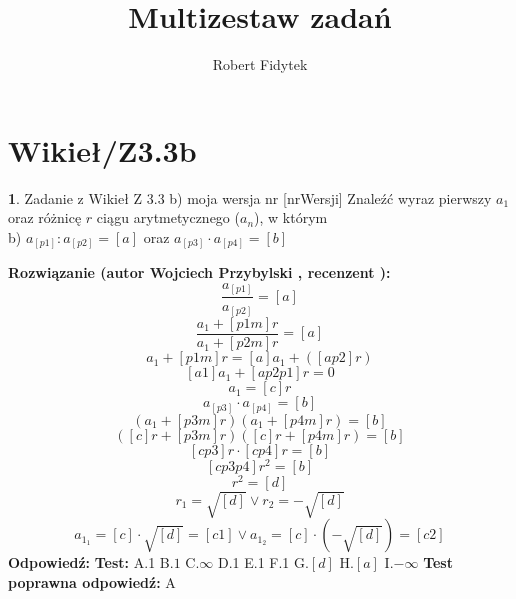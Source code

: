 \documentclass[12pt, a4paper]{article}
\title{Multizestaw zadań}
\author{Robert Fidytek}
\date{}
\theoremstyle{definition} %
\newtheorem{zad}{}
\newcommand{\kategoria}[1]{\section{#1}} %
\newcommand{\zadStart}[1]{\begin{zad}#1\newline} %
\newcommand{\zadStop}{\end{zad}}   %
\newcommand{\rozwStart}[2]{\noindent \textbf{Rozwiązanie (autor #1 , recenzent #2): }\newline} %
\newcommand{\rozwStop}{\newline}                                            %
\newcommand{\odpStart}{\noindent \textbf{Odpowiedź:}\newline}    %
\newcommand{\odpStop}{\newline}                                             %
\newcommand{\testStart}{\noindent \textbf{Test:}\newline} %
\newcommand{\testStop}{\newline} %
\newcommand{\kluczStart}{\noindent \textbf{Test poprawna odpowiedź:}\newline} %
\newcommand{\kluczStop}{\newline} %
\begin{document}
\maketitle


\kategoria{Wikieł/Z3.3b}
\zadStart{Zadanie z Wikieł Z 3.3 b) moja wersja nr [nrWersji]}
Znaleźć wyraz pierwszy $a_{1}$ oraz różnicę $r$ ciągu arytmetycznego ($a_{n}$), w którym \\
b) $a_{[p1]} : a_{[p2]}=[a]$ oraz $a_{[p3]}\cdot a_{[p4]}=[b]$
\zadStop
\rozwStart{Wojciech Przybylski}{}
$$\frac{a_{[p1]}}{a_{[p2]}}=[a]$$
$$\frac{a_{1}+[p1m]r}{a_{1}+[p2m]r}=[a]$$
$$a_{1}+[p1m]r= [a]a_{1}+([ap2]r)$$
$$[a1]a_{1}+[ap2p1]r=0$$
$$a_{1}=[c]r$$
$$a_{[p3]}\cdot a_{[p4]}=[b]$$
$$(a_{1}+[p3m]r)(a_{1}+[p4m]r)=[b]$$
$$([c]r+[p3m]r)([c]r+[p4m]r)=[b]$$
$$[cp3]r\cdot [cp4]r=[b]$$
$$[cp3p4]r^{2}=[b]$$
$$r^{2}=[d]$$
$$r_{1}=\sqrt{[d]} \vee r_{2}=-\sqrt{[d]}$$
$$a_{1_{1}}=[c]\cdot\sqrt{[d]}=[c1] \vee a_{1_{2}}=[c]\cdot(-\sqrt{[d]})=[c2]$$
\rozwStop
\odpStart
1
\odpStop
\testStart
A.1
B.$1$
C.$\infty$
D.1
E.1
F.1
G.$[d]$
H.$[a]$
I.$-\infty$
\testStop
\kluczStart
A
\kluczStop
\end{document}
